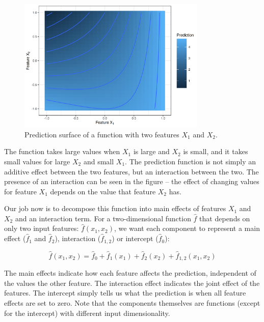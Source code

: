 \documentclass[
  11pt,
]{scrbook}
\begin{document}
\begin{figure}

{\centering \includegraphics[width=0.8\textwidth]{images/unnamed-chunk-16-1} 

}

\caption{Prediction surface of a function with two features $X_1$ and $X_2$.}\label{fig:unnamed-chunk-16}
\end{figure}

The function takes large values when \(X_1\) is large and \(X_2\) is small, and it takes small values for large \(X_2\) and small \(X_1\).
The prediction function is not simply an additive effect between the two features, but an interaction between the two.
The presence of an interaction can be seen in the figure -- the effect of changing values for feature \(X_1\) depends on the value that feature \(X_2\) has.

Our job now is to decompose this function into main effects of features \(X_1\) and \(X_2\) and an interaction term.
For a two-dimensional function \(\hat{f}\) that depends on only two input features: \(\hat{f}(x_1, x_2)\), we want each component to represent a main effect (\(\hat{f}_1\) and \(\hat{f}_2\)), interaction (\(\hat{f}_{1,2}\)) or intercept (\(\hat{f}_0\)):

\[\hat{f}(x_1, x_2) = \hat{f}_0 + \hat{f}_1(x_1) + \hat{f}_2(x_2) + \hat{f}_{1,2}(x_{1},x_{2})\]

The main effects indicate how each feature affects the prediction, independent of the values the other feature.
The interaction effect indicates the joint effect of the features.
The intercept simply tells us what the prediction is when all feature effects are set to zero.
Note that the components themselves are functions (except for the intercept) with different input dimensionality.
\end{document}
